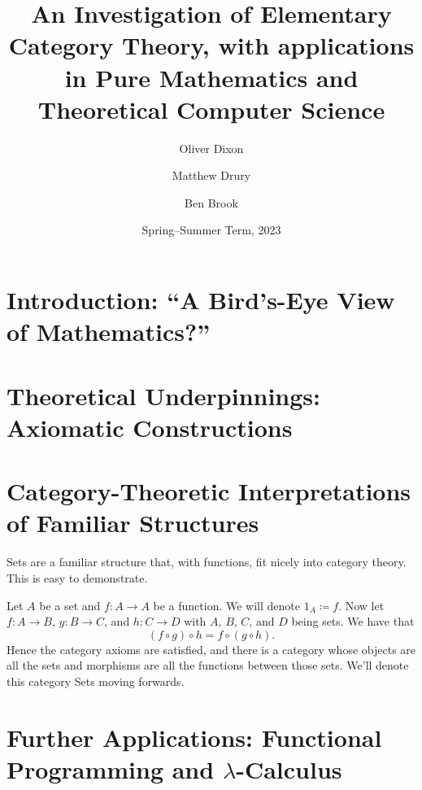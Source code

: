 \documentclass[10pt,a4paper]{amsart}
\title[An Investigation of Elementary Category Theory]{An Investigation of %
        Elementary Category Theory, with applications in Pure Mathematics and %
        Theoretical Computer Science}
\author{Oliver Dixon}  \email{\yorkemail{od641}}
\author{Matthew Drury} \email{\yorkemail{md1499}}
\author{Ben Brook}     \email{\yorkemail{bb1170}}
\date{Spring--Summer Term, 2023}
\begin{document}
%
\begin{abstract}
        \lipsum[1-1]
\end{abstract}
\maketitle
\tableofcontents
\section{Introduction: ``A Bird's-Eye View of Mathematics?''}
\lipsum[2-8]
\section{Theoretical %
        Underpinnings: Axiomatic Constructions}
\lipsum[9-28]
\section{Category-Theoretic %
        Interpretations of Familiar Structures}
        Sets are a familiar structure that, with functions, fit nicely into category theory. This is easy to demonstrate.
        
        Let $A$ be a set and $f \colon A \to A$ be a function. We will denote $1_A \coloneqq f$.
        Now let $f \colon A \to B$, $y \colon B \to C$, and $h \colon C \to D$ with $A$, $B$, $C$, and $D$ being sets. We have that
        \[
        \left( f \circ g \right) \circ h = f \circ \left( g \circ h \right) \textrm{.}
        \]
        Hence the category axioms are satisfied, and there is a category whose objects are all the sets and morphisms are all the functions between those sets. We'll denote this category Sets moving forwards.

\section{Further Applications: %
        Functional Programming and \texorpdfstring{$\lambda$}{Lambda}-Calculus}
\lipsum[49-68]
\printbibliography[title=Cited Works and Further Reading]
%
\end{document}
